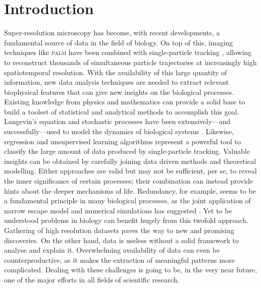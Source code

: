 
\chapter{Introduction}\label{sec:introduction}

Super-resolution microscopy has become, with recent developments, a fundamental source of data in the field of biology. On top of this, imaging techniques like \textsc{palm} have been combined with single-particle tracking , allowing to reconstruct thousands of simultaneous particle trajectories at increasingly high spatiotemporal resolution. With the availability of this large quantity of information, new data analysis techniques are needed to extract relevant biophysical features that can give new insights on the biological processes. Existing knowledge from physics and mathematics can provide a solid base to build a toolset of statistical and analytical methods to accomplish this goal. Langevin's equation and stochastic processes have been extensively---and successfully---used to model the dynamics of biological systems . Likewise, regression and unsupervised learning algorithms represent a powerful tool to classify the large amount of data produced by single-particle tracking. Valuable insights can be obtained by carefully joining data driven methods and theoretical modelling. Either approaches are valid but may not be sufficient, per se, to reveal the inner significance of certain processes; their combination can instead provide hints about the deeper mechanisms of life. Redundancy, for example, seems to be a fundamental principle in many biological processes, as the joint application of narrow escape model and numerical simulations has suggested . Yet to be understood problems in biology can benefit hugely from this twofold approach. Gathering of high resolution datasets paves the way to new and promising discoveries. On the other hand, data is useless without a solid framework to analyse and explain it. Overwhelming availability of data can even be counterproductive, as it makes the extraction of meaningful patterns more complicated. Dealing with these challenges is going to be, in the very near future, one of the major efforts in all fields of scientific research.

